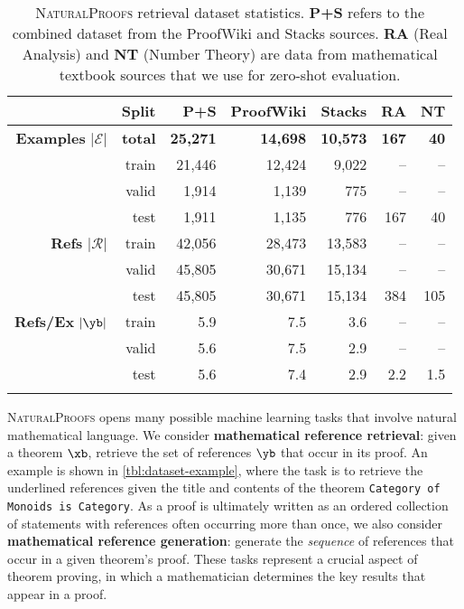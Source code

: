 \begin{table}[t]
\footnotesize
\centering
\begin{tabular}{rr|rrr|rr}
\toprule
& \textbf{Split} & \textbf{P+S} & \textbf{ProofWiki} & \textbf{Stacks} & \textbf{RA} & \textbf{NT} \\
\toprule
\textbf{Examples} $|\mathcal{E}|$ & \textbf{total} & \textbf{25,271} & \textbf{14,698} & \textbf{10,573} & \textbf{167} & \textbf{40} \\
                                  & train & 21,446 & 12,424 & 9,022 & -- & -- \\
                                  & valid & 1,914 & 1,139 & 775 & -- & -- \\
                                  & test  & 1,911 & 1,135 & 776 & 167 & 40 \\
                                  \midrule
\textbf{Refs} $|\mathcal{R}|$     & train & 42,056 & 28,473 & 13,583 & -- & -- \\
                                  & valid & 45,805 & 30,671 & 15,134 & -- & -- \\
                                  & test  & 45,805 & 30,671 & 15,134 & 384 & 105 \\
                                  \midrule
\textbf{Refs/Ex} $|\yb|$          & train & 5.9 & 7.5 & 3.6 & -- & -- \\
                                  & valid & 5.6 & 7.5 & 2.9 & -- & -- \\
                                  & test  & 5.6 & 7.4 & 2.9 & 2.2 & 1.5 \\
\bottomrule
\addlinespace[0.4em]
\end{tabular}
\caption{
    \textsc{NaturalProofs} retrieval dataset statistics.
    \textbf{P+S} refers to the combined dataset from the ProofWiki and Stacks sources.
    \textbf{RA} (Real Analysis) and \textbf{NT} (Number Theory) are data from mathematical textbook sources that we use for zero-shot evaluation.
}
\label{tbl:dataset-retrieval-stats}
\end{table}
\textsc{NaturalProofs} opens many possible machine learning tasks that involve natural mathematical language.
We consider \textbf{mathematical reference retrieval}: given a theorem $\xb$, retrieve the set of references $\yb$ that occur in its proof.
An example is shown in \autoref{tbl:dataset-example}, where the task is to retrieve the underlined references given the title and contents of the theorem \texttt{Category of Monoids is Category}.
As a proof is ultimately written as an ordered collection of statements with references often occurring more than once, we also consider \textbf{mathematical reference generation}: generate the \textit{sequence} of references that occur in a given theorem's proof. 
These tasks represent a crucial aspect of theorem proving, in which a mathematician determines the key results that appear in a proof.

